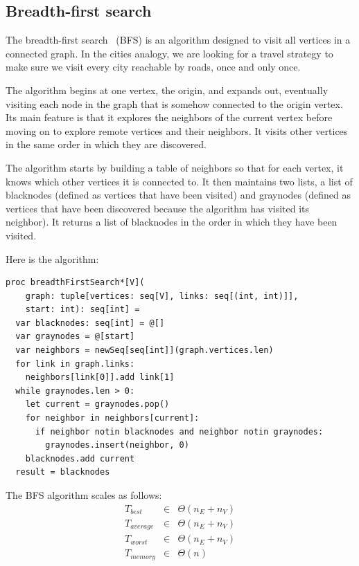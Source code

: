 \documentclass[justified, sixbynine]{tufte-book}
\def\ft{\small\tt}
\theoremstyle{plain}%
\newtheorem * {corollary}{Corollary}
\theoremstyle{definition}
\theoremstyle{remark}
\newtheorem * {remark}{Remark}
\newtheorem * {note}{Note}
\begin{document}
\begin{fullwidth}
\subsection{Breadth-first search}


The breadth-first search~\cite{bfs} (BFS) is an algorithm designed to visit all vertices in a connected graph. In the cities analogy, we are looking for a travel strategy to make sure we visit every city reachable by roads, once and only once.

The algorithm begins at one vertex, the origin, and expands out, eventually visiting each node in the graph that is somehow connected to the origin vertex. Its main feature is that it explores the neighbors of the current vertex before moving on to explore remote vertices and their neighbors. It visits other vertices in the same order in which they are discovered.

The algorithm starts by building a table of neighbors so that for each vertex, it knows which other vertices it is connected to. It then maintains two lists, a list of blacknodes (defined as vertices that have been visited) and graynodes (defined as vertices that have been discovered because the algorithm has visited its neighbor). It returns a list of blacknodes in the order in which they have been visited.

Here is the algorithm:

\begin{lstlisting}[caption={in file: {\ft nlib/graph.nim}}]
proc breadthFirstSearch*[V](
    graph: tuple[vertices: seq[V], links: seq[(int, int)]],
    start: int): seq[int] =
  var blacknodes: seq[int] = @[]
  var graynodes = @[start]
  var neighbors = newSeq[seq[int]](graph.vertices.len)
  for link in graph.links:
    neighbors[link[0]].add link[1]
  while graynodes.len > 0:
    let current = graynodes.pop()
    for neighbor in neighbors[current]:
      if neighbor notin blacknodes and neighbor notin graynodes:
        graynodes.insert(neighbor, 0)
    blacknodes.add current
  result = blacknodes
\end{lstlisting}

The BFS algorithm scales as follows:
\begin{eqnarray}
T_{best} &\in &\Theta (n_E+n_V) \\
T_{average} &\in &\Theta (n_E+n_V) \\
T_{worst} &\in &\Theta (n_E+n_V) \\
T_{memory} &\in &\Theta (n)
\end{eqnarray}


\end{fullwidth}
\end{document}
